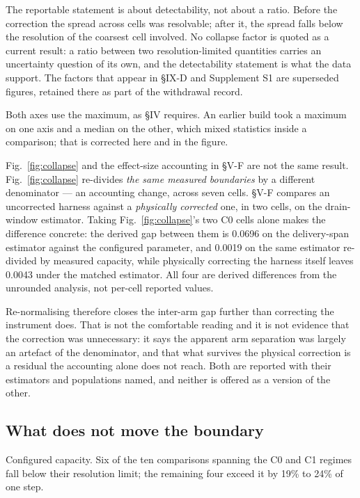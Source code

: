 \documentclass{ieeeaccess}
\begin{document}
The reportable statement is about detectability, not about a ratio. Before the correction the spread across cells was resolvable; after it, the spread falls below the resolution of the coarsest cell involved. No collapse factor is quoted as a current result: a ratio between two resolution-limited quantities carries an uncertainty question of its own, and the detectability statement is what the data support. The factors that appear in \S{}IX-D and Supplement S1 are superseded figures, retained there as part of the withdrawal record.

Both axes use the maximum, as \S{}IV requires. An earlier build took a maximum on one axis and a median on the other, which mixed statistics inside a comparison; that is corrected here and in the figure.

Fig.~\ref{fig:collapse} and the effect-size accounting in \S{}V-F are not the same result. Fig.~\ref{fig:collapse} re-divides \textit{the same measured boundaries} by a different denominator --- an accounting change, across seven cells. \S{}V-F compares an uncorrected harness against a \textit{physically corrected} one, in two cells, on the drain-window estimator. Taking Fig.~\ref{fig:collapse}'s two C0 cells alone makes the difference concrete: the derived gap between them is 0.0696 on the delivery-span estimator against the configured parameter, and 0.0019 on the same estimator re-divided by measured capacity, while physically correcting the harness itself leaves 0.0043 under the matched estimator. All four are derived differences from the unrounded analysis, not per-cell reported values.

Re-normalising therefore closes the inter-arm gap further than correcting the instrument does. That is not the comfortable reading and it is not evidence that the correction was unnecessary: it says the apparent arm separation was largely an artefact of the denominator, and that what survives the physical correction is a residual the accounting alone does not reach. Both are reported with their estimators and populations named, and neither is offered as a version of the other.

\subsection{What does not move the boundary}

Configured capacity. Six of the ten comparisons spanning the C0 and C1 regimes fall below their resolution limit; the remaining four exceed it by 19\% to 24\% of one step.
\end{document}
